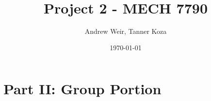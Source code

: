 \documentclass[12pt, letterpaper, onecolumn]{article}
\title{Project 2 - MECH 7790}
\author{Andrew Weir, Tanner Koza}
\date\today
\begin{document}
\maketitle

\section*{Part II: Group Portion}


\clearpage

\end{document}
